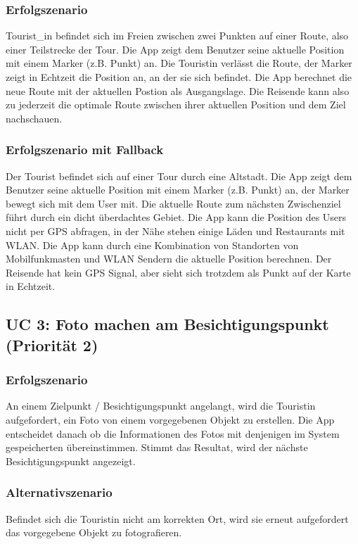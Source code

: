 \documentclass[a4paper,10pt,xetex]{article}
\begin{document}
\subsubsection{Erfolgszenario}\label{erfolgszenario}
Tourist\_in befindet sich im Freien zwischen zwei Punkten auf einer
Route, also einer Teilstrecke der Tour. Die App zeigt dem Benutzer seine
aktuelle Position mit einem Marker (z.B. Punkt) an. Die Touristin verlässt
die Route, der Marker zeigt in Echtzeit die Position an, an der sie sich
befindet. Die App berechnet die neue Route mit der aktuellen Postion als
Ausgangslage. Die Reisende kann also zu jederzeit die optimale Route
zwischen ihrer aktuellen Position und dem Ziel nachschauen.


\subsubsection{Erfolgszenario mit Fallback}\label{erfolgszenario-mit-fallback}
Der Tourist befindet sich auf einer Tour durch eine Altstadt. Die App
zeigt dem Benutzer seine aktuelle Position mit einem Marker (z.B. Punkt)
an, der Marker bewegt sich mit dem User mit. Die aktuelle Route zum
nächsten Zwischenziel führt durch ein dicht überdachtes Gebiet. Die App
kann die Position des Users nicht per GPS abfragen, in der Nähe stehen
einige Läden und Restaurants mit WLAN. Die App kann durch eine
Kombination von Standorten von Mobilfunkmasten und WLAN Sendern die
aktuelle Position berechnen. Der Reisende hat kein GPS Signal, aber
sieht sich trotzdem als Punkt auf der Karte in Echtzeit.


\subsection{UC 3: Foto machen am Besichtigungspunkt (Priorität 2)}\label{uc-3-user-macht-foto-am-besichtigungspunkt-priorituxe4t-2}
\subsubsection{Erfolgszenario}\label{erfolgszenario-1}
An einem Zielpunkt / Besichtigungspunkt angelangt, wird die Touristin aufgefordert, ein Foto von einem vorgegebenen Objekt zu erstellen. Die
App entscheidet danach ob die Informationen des Fotos mit denjenigen im
System gespeicherten übereinstimmen. Stimmt das Resultat, wird der
nächste Besichtigungspunkt angezeigt.


\subsubsection{Alternativszenario}\label{alternativszenario}
Befindet sich die Touristin nicht am korrekten Ort, wird sie erneut
aufgefordert das vorgegebene Objekt zu fotografieren.
\end{document}
